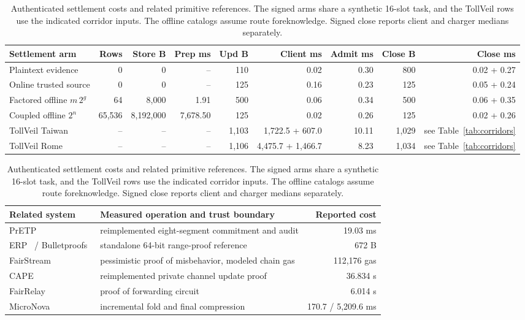 \begin{table}[t]
\centering
\scriptsize
\setlength{\tabcolsep}{4pt}
\begin{tabular}{@{}lrrrrrrrr@{}}
\toprule
Settlement arm & Rows & Store B & Prep ms & Upd B & Client ms & Admit ms & Close B & Close ms \\
\midrule
Plaintext evidence & 0 & 0 & -- & 110 & 0.02 & 0.30 & 800 & 0.02 + 0.27 \\
Online trusted source & 0 & 0 & -- & 125 & 0.16 & 0.23 & 125 & 0.05 + 0.24 \\
Factored offline $m\,2^g$ & 64 & 8,000 & 1.91 & 500 & 0.06 & 0.34 & 500 & 0.06 + 0.35 \\
Coupled offline $2^n$ & 65,536 & 8,192,000 & 7,678.50 & 125 & 0.02 & 0.26 & 125 & 0.02 + 0.26 \\
\midrule
TollVeil Taiwan & -- & -- & -- & 1,103 & 1,722.5 + 607.0 & 10.11 & 1,029 & see Table~\ref{tab:corridors} \\
TollVeil Rome & -- & -- & -- & 1,106 & 4,475.7 + 1,466.7 & 8.23 & 1,034 & see Table~\ref{tab:corridors} \\
\bottomrule
\end{tabular}
\par\smallskip\begin{tabular}{@{}llr@{}}\toprule
Related system & Measured operation and trust boundary & Reported cost \\
\midrule
PrETP~\cite{pretp2010} & reimplemented eight-segment commitment and audit & 19.03 ms \\
ERP~\cite{desmet2024} / Bulletproofs~\cite{bulletproofs2018} & standalone 64-bit range-proof reference & 672 B \\
FairStream~\cite{fairstream2023} & pessimistic proof of misbehavior, modeled chain gas & 112,176 gas \\
CAPE~\cite{cape2025} & reimplemented private channel update proof & 36.834 s \\
FairRelay~\cite{fairrelay2026} & proof of forwarding circuit & 6.014 s \\
MicroNova~\cite{micronova2025} & incremental fold and final compression & 170.7 / 5,209.6 ms \\
\bottomrule\end{tabular}
\caption{Authenticated settlement costs and related primitive references. The signed arms share a synthetic 16-slot task, and the TollVeil rows use the indicated corridor inputs. The offline catalogs assume route foreknowledge. Signed close reports client and charger medians separately.}
\label{tab:baselines}
\end{table}
